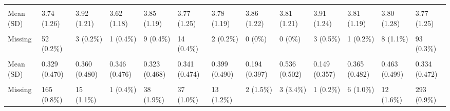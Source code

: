 \documentclass[
  single column]{article}
\begin{document}
\begin{landscape}
\begin{longtable}[t]{lllllllllllll}
\cellcolor{gray!10}{extraversion} & \cellcolor{gray!10}{} & \cellcolor{gray!10}{} & \cellcolor{gray!10}{} & \cellcolor{gray!10}{} & \cellcolor{gray!10}{} & \cellcolor{gray!10}{} & \cellcolor{gray!10}{} & \cellcolor{gray!10}{} & \cellcolor{gray!10}{} & \cellcolor{gray!10}{} & \cellcolor{gray!10}{} & \cellcolor{gray!10}{}\\
Mean (SD) & 3.74 (1.26) & 3.92 (1.21) & 3.62 (1.18) & 3.85 (1.19) & 3.77 (1.25) & 3.78 (1.19) & 3.86 (1.22) & 3.81 (1.21) & 3.91 (1.24) & 3.81 (1.19) & 3.80 (1.28) & 3.77 (1.25)\\
\addlinespace
\cellcolor{gray!10}{Median [Min, Max]} & \cellcolor{gray!10}{3.75 [1.00, 7.00]} & \cellcolor{gray!10}{4.00 [1.00, 7.00]} & \cellcolor{gray!10}{3.67 [1.00, 7.00]} & \cellcolor{gray!10}{4.00 [1.00, 7.00]} & \cellcolor{gray!10}{3.75 [1.00, 7.00]} & \cellcolor{gray!10}{3.75 [1.00, 7.00]} & \cellcolor{gray!10}{4.00 [1.50, 7.00]} & \cellcolor{gray!10}{3.75 [1.00, 6.25]} & \cellcolor{gray!10}{4.00 [1.00, 7.00]} & \cellcolor{gray!10}{3.75 [1.00, 7.00]} & \cellcolor{gray!10}{3.75 [1.00, 7.00]} & \cellcolor{gray!10}{3.75 [1.00, 7.00]}\\
Missing & 52 (0.2\%) & 3 (0.2\%) & 1 (0.4\%) & 9 (0.4\%) & 14 (0.4\%) & 2 (0.2\%) & 0 (0\%) & 0 (0\%) & 3 (0.5\%) & 1 (0.2\%) & 8 (1.1\%) & 93 (0.3\%)\\
\cellcolor{gray!10}{hlth\_disability\_binary} & \cellcolor{gray!10}{} & \cellcolor{gray!10}{} & \cellcolor{gray!10}{} & \cellcolor{gray!10}{} & \cellcolor{gray!10}{} & \cellcolor{gray!10}{} & \cellcolor{gray!10}{} & \cellcolor{gray!10}{} & \cellcolor{gray!10}{} & \cellcolor{gray!10}{} & \cellcolor{gray!10}{} & \cellcolor{gray!10}{}\\
Mean (SD) & 0.329 (0.470) & 0.360 (0.480) & 0.346 (0.476) & 0.323 (0.468) & 0.341 (0.474) & 0.399 (0.490) & 0.194 (0.397) & 0.536 (0.502) & 0.149 (0.357) & 0.365 (0.482) & 0.463 (0.499) & 0.334 (0.472)\\
\cellcolor{gray!10}{Median [Min, Max]} & \cellcolor{gray!10}{0 [0, 1.00]} & \cellcolor{gray!10}{0 [0, 1.00]} & \cellcolor{gray!10}{0 [0, 1.00]} & \cellcolor{gray!10}{0 [0, 1.00]} & \cellcolor{gray!10}{0 [0, 1.00]} & \cellcolor{gray!10}{0 [0, 1.00]} & \cellcolor{gray!10}{0 [0, 1.00]} & \cellcolor{gray!10}{1.00 [0, 1.00]} & \cellcolor{gray!10}{0 [0, 1.00]} & \cellcolor{gray!10}{0 [0, 1.00]} & \cellcolor{gray!10}{0 [0, 1.00]} & \cellcolor{gray!10}{0 [0, 1.00]}\\
\addlinespace
Missing & 165 (0.8\%) & 15 (1.1\%) & 1 (0.4\%) & 38 (1.9\%) & 37 (1.0\%) & 13 (1.2\%) & 2 (1.5\%) & 3 (3.4\%) & 1 (0.2\%) & 6 (1.0\%) & 12 (1.6\%) & 293 (0.9\%)\\

\end{longtable}
\end{landscape}
\end{document}
